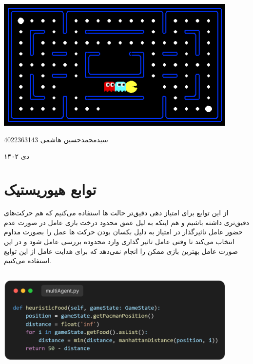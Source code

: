 \documentclass[12pt, dvipsnames, svgnames, x11names,]{article}
\begin{document}
	\begin{titlepage}
		\centering
		\vspace{1cm}
		{\Huge {\textbf{}}\par}
		\vspace{15mm}
		\vspace{16mm}
		\includegraphics[width=12cm]{images/pacman_multi_agent} \par
		\vfill \par	\vfill
		\vspace{16mm}
		{\normalsize	سیدمحمدحسین هاشمی  4022363143 \par}
		
		\vspace{1cm}
		{\large دی ۱۴۰۲\par}
	\end{titlepage}
	\tableofcontents
	\newpage
	
	
	\section{توابع هیوریستیک } \label{heuristic}
	
		{\normalsize از این توابع برای امتیاز دهی دقیق‌تر حالت ها استفاده می‌کنیم که هم حرکت‌های دقیق‌تری داشته باشیم و هم اینکه به لیل عمق محدود درخت بازی عامل در صورت عدم حضور عامل تاثیرگذار در امتیاز به دلیل بکسان بودن حرکت ها عمل  را بصورت مداوم انتخاب می‌کند تا وقتی عامل تاثیر گذاری وارد محدوده بررسی عامل شود و در این صورت عامل بهترین بازی ممکن را انجام نمی‌دهد که برای هدایت عامل از این توابع استفاده می‌کنیم.}
		
		\subsection{} \label{heuristicFood}
		
			\begin{center}
					\includegraphics[width=12cm]{images/01}
			\end{center}
			
\end{document}
